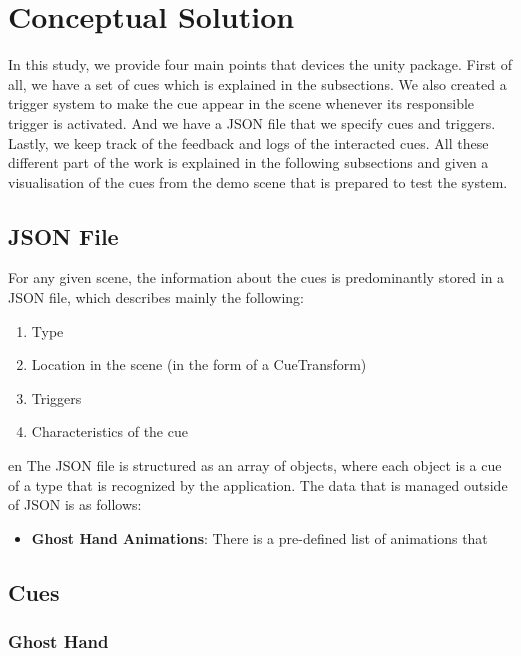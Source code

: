 \documentclass[conference]{IEEEtran}
\begin{document}
\section{Conceptual Solution}

In this study, we provide four main points that devices the unity package. First of all, we have a set of cues which is explained in the subsections. We also created a trigger system to make the cue appear in the scene whenever its responsible trigger is activated. And we have a JSON file that we specify cues and triggers. Lastly, we keep track of the feedback and logs of the interacted cues. All these different part of the work is explained in the following subsections and given a visualisation of the cues from the demo scene that is prepared to test the system.

\subsection{JSON File}
For any given scene, the information about the cues is predominantly stored in a JSON file, which describes mainly the following:
\begin{enumerate}
    \item Type
    \item Location in the scene (in the form of a CueTransform)
    \item Triggers
    \item Characteristics of the cue
\end{enumerate}{en}
The JSON file is structured as an array of objects, where each object is a cue of a type that is recognized by the application. The data that is managed outside of JSON is as follows:
\begin{itemize}
    \item \textbf{Ghost Hand Animations}: There is a pre-defined list of animations that 
\end{itemize}

\subsection{Cues}

\subsubsection{Ghost Hand}
\end{document}
